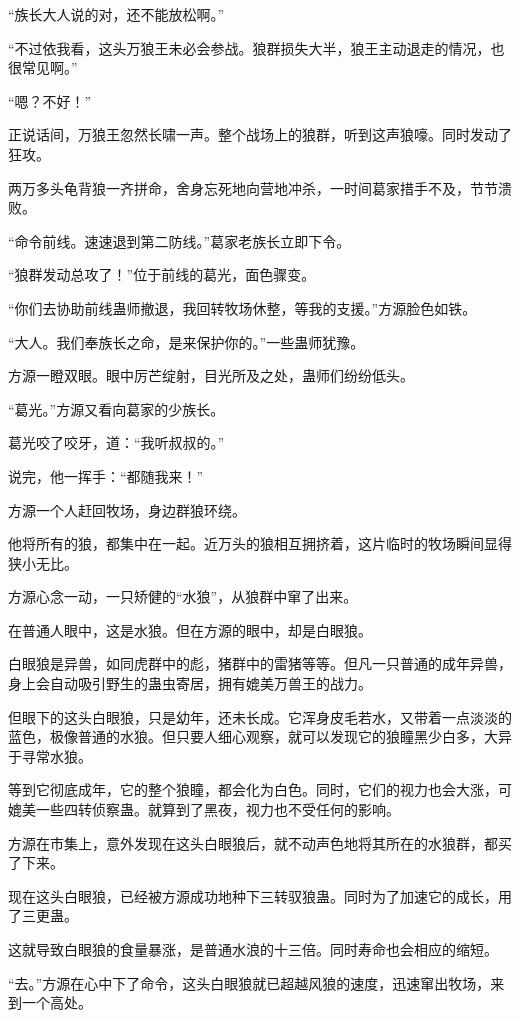 \begin{this_body}
“族长大人说的对，还不能放松啊。”

“不过依我看，这头万狼王未必会参战。狼群损失大半，狼王主动退走的情况，也很常见啊。”

“嗯？不好！”

正说话间，万狼王忽然长啸一声。整个战场上的狼群，听到这声狼嚎。同时发动了狂攻。

两万多头龟背狼一齐拼命，舍身忘死地向营地冲杀，一时间葛家措手不及，节节溃败。

“命令前线。速速退到第二防线。”葛家老族长立即下令。

“狼群发动总攻了！”位于前线的葛光，面色骤变。

“你们去协助前线蛊师撤退，我回转牧场休整，等我的支援。”方源脸色如铁。

“大人。我们奉族长之命，是来保护你的。”一些蛊师犹豫。

方源一瞪双眼。眼中厉芒绽射，目光所及之处，蛊师们纷纷低头。

“葛光。”方源又看向葛家的少族长。

葛光咬了咬牙，道：“我听叔叔的。”

说完，他一挥手：“都随我来！”

方源一个人赶回牧场，身边群狼环绕。

他将所有的狼，都集中在一起。近万头的狼相互拥挤着，这片临时的牧场瞬间显得狭小无比。

方源心念一动，一只矫健的“水狼”，从狼群中窜了出来。

在普通人眼中，这是水狼。但在方源的眼中，却是白眼狼。

白眼狼是异兽，如同虎群中的彪，猪群中的雷猪等等。但凡一只普通的成年异兽，身上会自动吸引野生的蛊虫寄居，拥有媲美万兽王的战力。

但眼下的这头白眼狼，只是幼年，还未长成。它浑身皮毛若水，又带着一点淡淡的蓝色，极像普通的水狼。但只要人细心观察，就可以发现它的狼瞳黑少白多，大异于寻常水狼。

等到它彻底成年，它的整个狼瞳，都会化为白色。同时，它们的视力也会大涨，可媲美一些四转侦察蛊。就算到了黑夜，视力也不受任何的影响。

方源在市集上，意外发现在这头白眼狼后，就不动声色地将其所在的水狼群，都买了下来。

现在这头白眼狼，已经被方源成功地种下三转驭狼蛊。同时为了加速它的成长，用了三更蛊。

这就导致白眼狼的食量暴涨，是普通水浪的十三倍。同时寿命也会相应的缩短。

“去。”方源在心中下了命令，这头白眼狼就已超越风狼的速度，迅速窜出牧场，来到一个高处。


\end{this_body}
